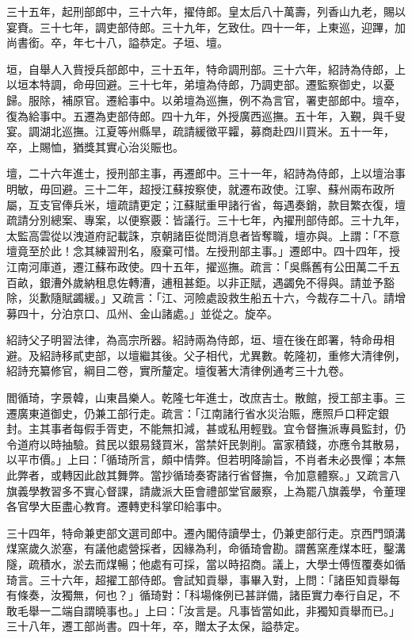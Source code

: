 \begin{pinyinscope}
三十五年，起刑部郎中，三十六年，擢侍郎。皇太后八十萬壽，列香山九老，賜以宴賚。三十七年，調吏部侍郎。三十九年，乞致仕。四十一年，上東巡，迎蹕，加尚書銜。卒，年七十八，謚恭定。子垣、壇。

垣，自舉人入貲授兵部郎中，三十五年，特命調刑部。三十六年，紹詩為侍郎，上以垣本特調，命毋回避。三十七年，弟壇為侍郎，乃調吏部。遷監察御史，以憂歸。服除，補原官。遷給事中。以弟壇為巡撫，例不為言官，署吏部郎中。壇卒，復為給事中。五遷為吏部侍郎。四十九年，外授廣西巡撫。五十年，入覲，與千叟宴。調湖北巡撫。江夏等州縣旱，疏請緩徵平糶，募商赴四川買米。五十一年，卒，上賜恤，猶獎其實心治災賑也。

壇，二十六年進士，授刑部主事，再遷郎中。三十一年，紹詩為侍郎，上以壇治事明敏，毋回避。三十二年，超授江蘇按察使，就遷布政使。江寧、蘇州兩布政所屬，互支官俸兵米，壇疏請更定；江蘇賦重甲諸行省，每遇奏銷，款目繁衣復，壇疏請分別總案、專案，以便察覈：皆議行。三十七年，內擢刑部侍郎。三十九年，太監高雲從以洩道府記載誅，京朝諸臣從問消息者皆奪職，壇亦與。上謂：「不意壇竟至於此！念其練習刑名，廢棄可惜。左授刑部主事。」遷郎中。四十四年，授江南河庫道，遷江蘇布政使。四十五年，擢巡撫。疏言：「吳縣舊有公田萬二千五百畝，銀漕外歲納租息佐轉漕，逋租甚鉅。以非正賦，遇蠲免不得與。請並予豁除，災歉隨賦蠲緩。」又疏言：「江、河險處設救生船五十六，今裁存二十八。請增募四十，分泊京口、瓜州、金山諸處。」並從之。旋卒。

紹詩父子明習法律，為高宗所器。紹詩兩為侍郎，垣、壇在後在郎署，特命毋相避。及紹詩移貳吏部，以壇繼其後。父子相代，尤異數。乾隆初，重修大清律例，紹詩充纂修官，綱目二卷，實所釐定。壇復著大清律例通考三十九卷。

閻循琦，字景韓，山東昌樂人。乾隆七年進士，改庶吉士。散館，授工部主事。三遷廣東道御史，仍兼工部行走。疏言：「江南諸行省水災治賑，應照戶口秤定銀封。主其事者每假手胥吏，不能無扣減，甚或私用輕戥。宜令督撫派專員監封，仍令道府以時抽驗。貧民以銀易錢買米，當禁奸民剝削。富家積錢，亦應令其散易，以平市價。」上曰：「循琦所言，頗中情弊。但若明降諭旨，不肖者未必畏憚；本無此弊者，或轉因此啟其舞弊。當抄循琦奏寄諸行省督撫，令加意體察。」又疏言八旗義學教習多不實心督課，請歲派大臣會禮部堂官嚴察，上為罷八旗義學，令董理各官學大臣盡心教育。遷轉吏科掌印給事中。

三十四年，特命兼吏部文選司郎中。遷內閣侍讀學士，仍兼吏部行走。京西門頭溝煤窯歲久淤塞，有議他處營採者，因緣為利，命循琦會勘。謂舊窯產煤本旺，鑿溝隧，疏積水，淤去而煤暢；他處有可採，當以時招商。議上，大學士傅恆覆奏如循琦言。三十六年，超擢工部侍郎。會試知貢舉，事畢入對，上問：「諸臣知貢舉每有條奏，汝獨無，何也？」循琦對：「科場條例已甚詳備，諸臣實力奉行自足，不敢毛舉一二端自謂曉事也。」上曰：「汝言是。凡事皆當如此，非獨知貢舉而已。」三十八年，遷工部尚書。四十年，卒，贈太子太保，謚恭定。


\end{pinyinscope}
